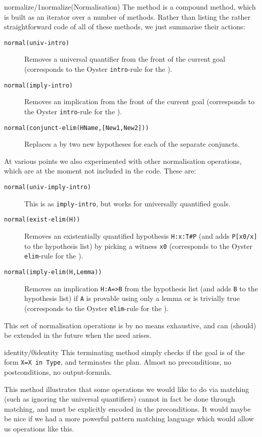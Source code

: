 \begin{method}{normalize/1}{normalize(Normalisation)}%
The  method is a compound method, which is built as an
iterator over a number of  methods. Rather than listing
the rather straightforward code of all of these methods, we just
summarise their actions:
\begin{description}

\item[{\tt normal(univ-intro)}]
Removes a universal quantifier from the front of the current goal
(corresponds to the Oyster {\tt intro}-rule for the ).

\item[{\tt normal(imply-intro)}]
Removes an implication from the front of the current goal (corresponds
to the Oyster {\tt intro}-rule for the ).

\item[{\tt normal(conjunct-elim(HName,[New1,New2]))}]
Replaces a  by two new hypotheses for each
of the separate conjuncts.
\end{description}
At various points we also experimented with other normalisation
operations, which are at the moment not included in the code. 
These are:
\begin{description}
\item[{\tt normal(univ-imply-intro)}] This is as {\tt imply-intro}, but works 
for universally quantified goals.

\item[{\tt normal(exist-elim(H))}]
Removes an existentially quantified hypothesis {\tt H:x:T\#P}
(and adds {\tt P[x0/x]} to the hypothesis list) by picking a witness
{\tt x0} (corresponds to the Oyster {\tt elim}-rule 
for the ).

\item[{\tt normal(imply-elim(H,Lemma))}]
Removes an implication {\tt H:A=>B} from the hypothesis list (and
adds {\tt B} to the hypothesis list) if {\tt A} is provable using only
a lemma or is trivially true (corresponds to the Oyster {\tt elim}-rule 
for the ).

\end{description}
This set of normalisation operations is by no means exhaustive, and
can (should) be extended in the future when the need arises. 
\end{method}

\begin{method}{identity/0}{identity}%
{\tiny
}
This terminating method simply checks if the goal is of the form
{\tt X=X in Type}, and terminates the plan. Almost no preconditions, no
postconditions, no output-formula.

This method illustrates that some operations we would like to do via \notnice
matching (such as ignoring the universal quantifiers) cannot in fact be
done through matching, and must be explicitly encoded in the
preconditions. It would maybe be nice if we had a more powerful
pattern matching language which would allow us operations like this. 
\end{method}

